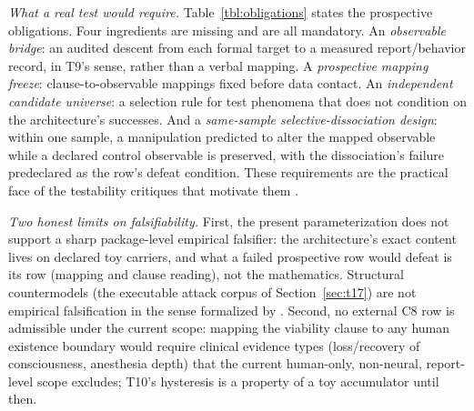 \documentclass[11pt]{article}
\theoremstyle{definition}
\begin{document}
\emph{What a real test would require.} Table~\ref{tbl:obligations} states the
prospective obligations. Four ingredients are missing and are all mandatory.
An \emph{observable bridge}: an audited descent from each formal target to
a measured report/behavior record, in T9's sense, rather than a verbal
mapping. A \emph{prospective mapping freeze}: clause-to-observable mappings
fixed before data contact. An \emph{independent candidate universe}: a
selection rule for test phenomena that does not condition on the
architecture's successes. And a \emph{same-sample selective-dissociation
design}: within one sample, a manipulation predicted to alter the mapped
observable while a declared control observable is preserved, with the
dissociation's failure predeclared as the row's defeat condition. These
requirements are the practical face of the testability critiques that
motivate them \citep{KleinerHoel2021, DoerigEtAl2020HardCriteria}.

\emph{Two honest limits on falsifiability.} First, the present
parameterization does not support a sharp package-level empirical falsifier:
the architecture's exact content lives on declared toy carriers, and what a
failed prospective row would defeat is its row (mapping and clause reading),
not the mathematics. Structural countermodels (the executable attack
corpus of Section~\ref{sec:t17}) are not empirical falsification in the sense
formalized by \citet{KleinerHoel2021}. Second, no external C8 row is
admissible under the current scope: mapping the viability clause to any
human existence boundary would require clinical evidence types
(loss/recovery of consciousness, anesthesia depth) that the current
human-only, non-neural, report-level scope excludes; T10's hysteresis is a
property of a toy accumulator until then.
\end{document}
